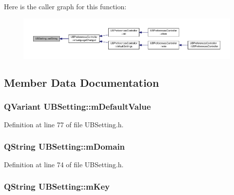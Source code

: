 Here is the caller graph for this function\-:
\nopagebreak
\begin{figure}[H]
\begin{center}
\leavevmode
\includegraphics[width=350pt]{d7/d24/class_u_b_setting_a452bf3be5cee45828397a0b141c9763f_icgraph}
\end{center}
\end{figure}




\subsection{Member Data Documentation}
\hypertarget{class_u_b_setting_a932900881cb5c54769356ed68955e721}{
\subsubsection[{m\-Default\-Value}]{\setlength{\rightskip}{0pt plus 5cm}Q\-Variant U\-B\-Setting\-::m\-Default\-Value\hspace{0.3cm}{\ttfamily [protected]}}}\label{d7/d24/class_u_b_setting_a932900881cb5c54769356ed68955e721}


Definition at line 77 of file U\-B\-Setting.\-h.

\hypertarget{class_u_b_setting_ab30419ac5f9361f4d65c6c998fdc33bd}{
\subsubsection[{m\-Domain}]{\setlength{\rightskip}{0pt plus 5cm}Q\-String U\-B\-Setting\-::m\-Domain\hspace{0.3cm}{\ttfamily [protected]}}}\label{d7/d24/class_u_b_setting_ab30419ac5f9361f4d65c6c998fdc33bd}


Definition at line 74 of file U\-B\-Setting.\-h.

\hypertarget{class_u_b_setting_a4e0199b4b8d6a065b899396b16f89ddd}{
\subsubsection[{m\-Key}]{\setlength{\rightskip}{0pt plus 5cm}Q\-String U\-B\-Setting\-::m\-Key\hspace{0.3cm}{\ttfamily [protected]}}}\label{d7/d24/class_u_b_setting_a4e0199b4b8d6a065b899396b16f89ddd}


